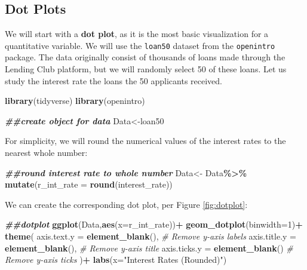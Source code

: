 \documentclass[
]{book}
\newenvironment{Shaded}{\begin{snugshade}}{\end{snugshade}}
\newcommand{\AttributeTok}[1]{\textcolor[rgb]{0.13,0.29,0.53}{#1}}
\newcommand{\CommentTok}[1]{\textcolor[rgb]{0.56,0.35,0.01}{\textit{#1}}}
\newcommand{\DecValTok}[1]{\textcolor[rgb]{0.00,0.00,0.81}{#1}}
\newcommand{\DocumentationTok}[1]{\textcolor[rgb]{0.56,0.35,0.01}{\textbf{\textit{#1}}}}
\newcommand{\FunctionTok}[1]{\textcolor[rgb]{0.13,0.29,0.53}{\textbf{#1}}}
\newcommand{\NormalTok}[1]{#1}
\newcommand{\OtherTok}[1]{\textcolor[rgb]{0.56,0.35,0.01}{#1}}
\newcommand{\SpecialCharTok}[1]{\textcolor[rgb]{0.81,0.36,0.00}{\textbf{#1}}}
\newcommand{\StringTok}[1]{\textcolor[rgb]{0.31,0.60,0.02}{#1}}
\begin{document}
\hypertarget{dot-plots}{%
\subsection{Dot Plots}\label{dot-plots}}

We will start with a \textbf{dot plot}, as it is the most basic visualization for a quantitative variable. We will use the \texttt{loan50} dataset from the \texttt{openintro} package. The data originally consist of thousands of loans made through the Lending Club platform, but we will randomly select 50 of these loans. Let us study the interest rate the loans the 50 applicants received.

\begin{Shaded}
\begin{Highlighting}[]
\FunctionTok{library}\NormalTok{(tidyverse)}
\FunctionTok{library}\NormalTok{(openintro)}

\DocumentationTok{\#\#create object for data}
\NormalTok{Data}\OtherTok{\textless{}{-}}\NormalTok{loan50}
\end{Highlighting}
\end{Shaded}

For simplicity, we will round the numerical values of the interest rates to the nearest whole number:

\begin{Shaded}
\begin{Highlighting}[]
\DocumentationTok{\#\#round interest rate to whole number}
\NormalTok{Data}\OtherTok{\textless{}{-}}\NormalTok{ Data}\SpecialCharTok{\%\textgreater{}\%}
  \FunctionTok{mutate}\NormalTok{(}\AttributeTok{r\_int\_rate =} \FunctionTok{round}\NormalTok{(interest\_rate))}
\end{Highlighting}
\end{Shaded}

We can create the corresponding dot plot, per Figure \ref{fig:dotplot}:

\begin{Shaded}
\begin{Highlighting}[]
\DocumentationTok{\#\#dotplot}
\FunctionTok{ggplot}\NormalTok{(Data,}\FunctionTok{aes}\NormalTok{(}\AttributeTok{x=}\NormalTok{r\_int\_rate))}\SpecialCharTok{+}
  \FunctionTok{geom\_dotplot}\NormalTok{(}\AttributeTok{binwidth=}\DecValTok{1}\NormalTok{)}\SpecialCharTok{+}
  \FunctionTok{theme}\NormalTok{(}
    \AttributeTok{axis.text.y =} \FunctionTok{element\_blank}\NormalTok{(),  }\CommentTok{\# Remove y{-}axis labels}
    \AttributeTok{axis.title.y =} \FunctionTok{element\_blank}\NormalTok{(), }\CommentTok{\# Remove y{-}axis title}
    \AttributeTok{axis.ticks.y =} \FunctionTok{element\_blank}\NormalTok{()  }\CommentTok{\# Remove y{-}axis ticks}
\NormalTok{  )}\SpecialCharTok{+} 
  \FunctionTok{labs}\NormalTok{(}\AttributeTok{x=}\StringTok{"Interest Rates (Rounded)"}\NormalTok{)}
\end{Highlighting}
\end{Shaded}
\end{document}
